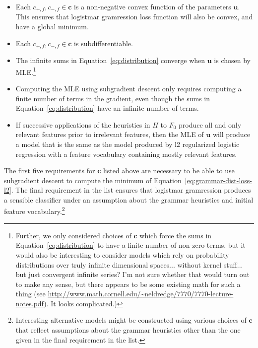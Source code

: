 \documentclass[11pt,letterpaper]{article}
\begin{document}
\begin{itemize}
\item Each $c_{+,f},c_{-,f}\in \mathbf{c}$ is a non-negative convex
function of the parameters $\mathbf{u}$.  This ensures that
logistmar gramression loss function will also be convex, and have
a global minimum.

\item Each $c_{+,f},c_{-,f}\in \mathbf{c}$ is subdifferentiable. 

\item The infinite sums in Equation~\ref{eq:distribution} 
converge when $\mathbf{u}$ is chosen by MLE.\footnote{Further, we only 
considered choices of $\mathbf{c}$ which
force the sums in Equation~\ref{eq:distribution} to have 
a finite number of non-zero terms, but it would
also be interesting to consider models which rely on
probability distributions over truly infinite dimensional
spaces... without kernel stuff... but just convergent infinite series? 
 I'm not sure whether 
that would turn out to make any 
sense, but there appears to be some existing math
for such a thing (see 
\url{http://www.math.cornell.edu/~neldredge/7770/7770-lecture-notes.pdf}). It looks complicated.)}

\item Computing the MLE using subgradient descent only requires
computing a finite number of terms in the gradient,
even though the sums in Equation~\ref{eq:distribution}
have an infinite number of terms.  

\item If successive applications of the heuristics in $H$ to $F_0$ 
produce all and only relevant features prior to irrelevant features,
then the MLE of $\mathbf{u}$ will produce a model that is
the same as the model produced by l2 regularized logistic regression
with a feature vocabulary containing mostly relevant features.

\end{itemize} 

The first five requirements for $\mathbf{c}$ listed above
are necessary to be able to use
subgradient descent to compute the minimum of 
Equation~\ref{eq:grammar-dist-loss-l2}.  The final requirement in
the list ensures that logistmar gramression produces a sensible
classifier under an assumption about the grammar heuristics and 
initial feature vocabulary.\footnote{Interesting
alternative models
might be constructed using various choices of $\mathbf{c}$
that reflect assumptions about the grammar heuristics 
other than the one given in the
final requirement in the list.}
 
\end{document}
